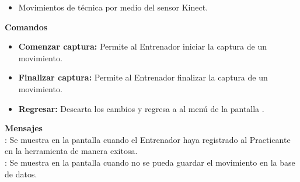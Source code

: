 \begin{itemize}
	\item Movimientos de técnica por medio del sensor Kinect.
\end{itemize}
\vspace{1em}

\textbf{\textcolor[rgb]{0, 0, 0.545098}{Comandos}}
\begin{itemize}
	\item \textbf{\textcolor[rgb]{0, 0, 0.545098}{Comenzar captura:}} Permite al Entrenador iniciar la captura de un movimiento.
	\item \textbf{\textcolor[rgb]{0, 0, 0.545098}{Finalizar captura:}} Permite al Entrenador finalizar la captura de un movimiento.
	\item \textbf{\textcolor[rgb]{0, 0, 0.545098}{Regresar:}} Descarta los cambios y regresa a al menú de la pantalla .
\end{itemize}

\vspace{1em}

\textbf{\textcolor[rgb]{0, 0, 0.545098}{Mensajes}}\\
	
\textbf{}: Se muestra en la pantalla  cuando el Entrenador haya registrado al Practicante en la herramienta de manera exitosa.\\

\textbf{}: Se muestra en la pantalla  cuando no se pueda guardar el movimiento en la base de datos.\\

\clearpage